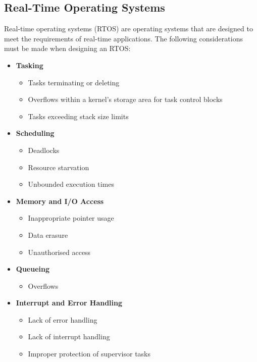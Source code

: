 \documentclass{article}
\begin{document}
\subsection{Real-Time Operating Systems}
Real-time operating systems (RTOS) are operating systems that are
designed to meet the requirements of real-time applications. The
following considerations must be made when designing an RTOS:\@
\begin{itemize}
    \item \textbf{Tasking}
          \begin{itemize}
              \item Tasks terminating or deleting
              \item Overflows within a kernel's storage area for task
                    control blocks
              \item Tasks exceeding stack size limits
          \end{itemize}
    \item \textbf{Scheduling}
          \begin{itemize}
              \item Deadlocks
              \item Resource starvation
              \item Unbounded execution times
          \end{itemize}
    \item \textbf{Memory and I/O Access}
          \begin{itemize}
              \item Inappropriate pointer usage
              \item Data erasure
              \item Unauthorised access
          \end{itemize}
    \item \textbf{Queueing}
          \begin{itemize}
              \item Overflows
          \end{itemize}
    \item \textbf{Interrupt and Error Handling}
          \begin{itemize}
              \item Lack of error handling
              \item Lack of interrupt handling
              \item Improper protection of supervisor tasks
          \end{itemize}
\end{itemize}
\end{document}

